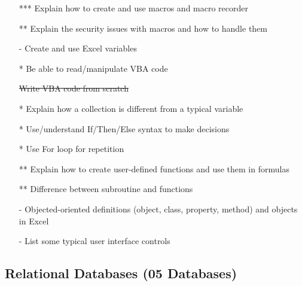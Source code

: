 \documentclass{article}%
\begin{document}
\begin{itemize}

\item[***] Explain how to create and use macros and macro recorder
 \item[**]Explain the security issues with macros and how to handle them
 \item[-] Create and use Excel variables
\item[*] Be able to read/manipulate VBA code 
\item[] \sout{Write VBA code from scratch} %
\item[*]  Explain how a collection is different from a typical variable
\item[*]  Use/understand If/Then/Else syntax to make decisions
\item[*]  Use For loop for repetition
 \item[**] Explain how to create user-defined functions and use them in formulas
 \item[**] Difference between subroutine and functions
\item[-] Objected-oriented definitions (object, class, property, method) and objects in Excel
\item[-]List some typical user interface controls
\end{itemize}




\subsection{Relational Databases (05 Databases)}
\end{document}
